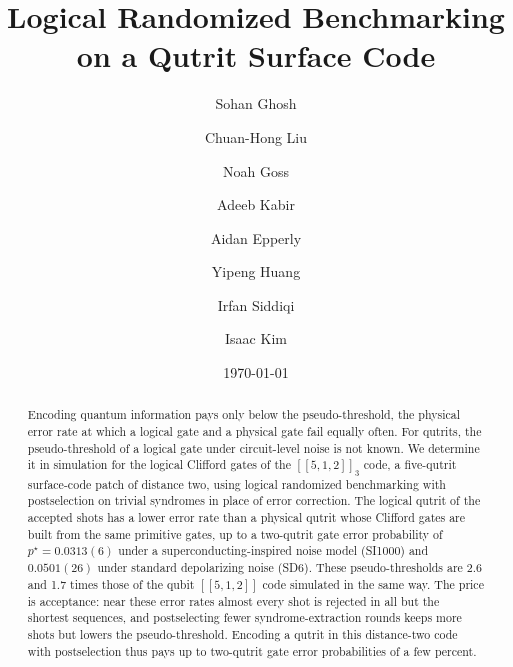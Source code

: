 \documentclass[aps,prxquantum,reprint,superscriptaddress,amsmath,amssymb,floatfix]{revtex4-2}
\begin{document}
\title{Logical Randomized Benchmarking on a Qutrit Surface Code}

\author{Sohan Ghosh}
\author{Chuan-Hong Liu}
\author{Noah Goss}
\author{Adeeb Kabir}
\author{Aidan Epperly}
\author{Yipeng Huang}
\author{Irfan Siddiqi}
\author{Isaac Kim}


\date{\today}


\begin{abstract}
Encoding quantum information pays only below the pseudo-threshold, the physical error rate at which a logical gate and a physical gate fail equally often. For qutrits, the pseudo-threshold of a logical gate under circuit-level noise is not known. We determine it in simulation for the logical Clifford gates of the $[[5,1,2]]_3$ code, a five-qutrit surface-code patch of distance two, using logical randomized benchmarking with postselection on trivial syndromes in place of error correction. The logical qutrit of the accepted shots has a lower error rate than a physical qutrit whose Clifford gates are built from the same primitive gates, up to a two-qutrit gate error probability of $p^\star = 0.0313(6)$ under a superconducting-inspired noise model (SI1000) and $0.0501(26)$ under standard depolarizing noise (SD6). These pseudo-thresholds are 2.6 and 1.7 times those of the qubit $[[5,1,2]]$ code simulated in the same way. The price is acceptance: near these error rates almost every shot is rejected in all but the shortest sequences, and postselecting fewer syndrome-extraction rounds keeps more shots but lowers the pseudo-threshold. Encoding a qutrit in this distance-two code with postselection thus pays up to two-qutrit gate error probabilities of a few percent.
\end{abstract}
\maketitle





\end{document}
